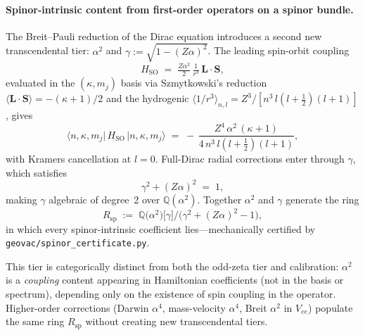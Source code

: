 \documentclass[aps,pra,twocolumn,superscriptaddress,longbibliography]{revtex4-2}
\begin{document}
\paragraph{Spinor-intrinsic content from first-order operators on a
spinor bundle.}
The Breit--Pauli reduction of the Dirac equation introduces a second
new transcendental tier: $\alpha^2$ and $\gamma := \sqrt{1 - (Z\alpha)^2}$.
The leading spin-orbit coupling
\begin{equation}\label{eq:bp_so}
  H_{\mathrm{SO}}
  \;=\; \tfrac{Z\alpha^2}{2}\,\tfrac{1}{r^3}\,\mathbf{L}\cdot\mathbf{S},
\end{equation}
evaluated in the $(\kappa, m_j)$ basis via Szmytkowski's reduction
$\langle \mathbf{L}\cdot\mathbf{S}\rangle = -(\kappa+1)/2$ and the
hydrogenic $\langle 1/r^3\rangle_{n,l}
= Z^3/[n^3\, l(l+\tfrac{1}{2})(l+1)]$, gives
\begin{equation}\label{eq:bp_so_matrix}
  \langle n,\kappa,m_j|\,H_{\mathrm{SO}}\,|n,\kappa,m_j\rangle
  \;=\; -\,\frac{Z^4\,\alpha^2\,(\kappa+1)}{4\,n^3\, l(l+\tfrac{1}{2})(l+1)},
\end{equation}
with Kramers cancellation at $l=0$.  Full-Dirac radial corrections enter
through $\gamma$, which satisfies
\begin{equation}\label{eq:gamma_def}
  \gamma^2 + (Z\alpha)^2 \;=\; 1,
\end{equation}
making $\gamma$ algebraic of degree~2 over $\mathbb{Q}(\alpha^2)$.
Together $\alpha^2$ and $\gamma$ generate the ring
\begin{equation}\label{eq:ring_sp}
  R_{\mathrm{sp}} \;:=\; \mathbb{Q}\bigl(\alpha^2\bigr)
    \bigl[\gamma\bigr]/\bigl(\gamma^2 + (Z\alpha)^2 - 1\bigr),
\end{equation}
in which every spinor-intrinsic coefficient lies---mechanically
certified by \texttt{geovac/spinor\_certificate.py}.

This tier is categorically distinct from both the odd-zeta tier and
calibration: $\alpha^2$ is a \emph{coupling} content appearing in
Hamiltonian coefficients (not in the basis or spectrum), depending only
on the existence of spin coupling in the operator.  Higher-order
corrections (Darwin $\alpha^4$, mass-velocity $\alpha^4$, Breit
$\alpha^2$ in $V_{ee}$) populate the same ring $R_{\mathrm{sp}}$ without
creating new transcendental tiers.
\end{document}

